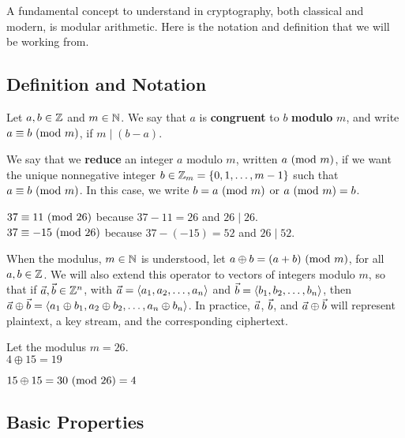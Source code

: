 	A fundamental concept to understand in cryptography, both classical and modern, is modular arithmetic.  Here is the notation and definition that we will be working from.

\subsection{Definition and Notation}
\label{sssec:mod-def}
\begin{definition}
Let $a, b\in\mathbb{Z}$ and $m\in\mathbb{N}$. We say that $a$ is {\bf congruent}  to $b$ {\bf modulo}  $m$, and write $a \equiv b \mbox{\ $\left(\mathrm{mod}\ {m}\right)$}$, if $m \mid (b-a)$. 

We say that we {\bf reduce}  an integer $a$ modulo $m$, written $a\mbox{\ $\left(\mathrm{mod}\ {m}\right)$}$, if we want the unique nonnegative integer $b\in\mathbb{Z}_m = \{0, 1, \ldots, m-1\}$ such that $a\equiv b\mbox{\ $\left(\mathrm{mod}\ {m}\right)$}$. In this case, we write $b = a\mbox{\ $\left(\mathrm{mod}\ {m}\right)$}$ or $a\mbox{\ $\left(\mathrm{mod}\ {m}\right)$}=b$.
\end{definition}

\begin{example}
  $37 \equiv 11 \mbox{\ $\left(\mathrm{mod}\ {26}\right)$}$ because $37-11 = 26$ and $26\mid 26$.\\
  $37 \equiv -15 \mbox{\ $\left(\mathrm{mod}\ {26}\right)$}$ because $37-(-15) = 52$ and $26\mid 52$.
\end{example}

\begin{definition}
	When the modulus, $m\in\mathbb{N}$ is understood, let $a\oplus b = (a+b)\mbox{\ $\left(\mathrm{mod}\ {m}\right)$}$, for all $a, b\in\mathbb{Z}$. We will also extend this operator to vectors of integers modulo $m$, so that if $\vec{a}, \vec{b}\in\mathbb{Z}^n$, with $\vec{a} = \left\langle a_1, a_2, \ldots, a_n\right\rangle$ and $\vec{b} = \left\langle b_1, b_2, \ldots, b_n\right\rangle$, then $\vec{a} \oplus\vec{b} = \left\langle a_1\oplus b_1, a_2\oplus b_2, \ldots, a_n\oplus b_n\right\rangle$. In practice, $\vec{a}$, $\vec{b}$, and $\vec{a}\oplus\vec{b}$ will represent plaintext, a key stream, and the corresponding ciphertext.
\end{definition}

\begin{example}
	Let the modulus $m = 26$.\\

$4 \oplus 15 =19$

$15 \oplus 15 = 30\mbox{\ $\left(\mathrm{mod}\ {26}\right)$} = 4$
\end{example}

\subsection{Basic Properties}

